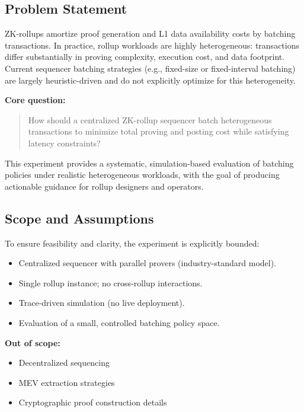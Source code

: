 \subsection{Problem Statement}

ZK-rollups amortize proof generation and L1 data availability costs by batching transactions. In practice, rollup workloads are highly heterogeneous: transactions differ substantially in proving complexity, execution cost, and data footprint. Current sequencer batching strategies (e.g., fixed-size or fixed-interval batching) are largely heuristic-driven and do not explicitly optimize for this heterogeneity.

\textbf{Core question:}
\begin{quote}
How should a centralized ZK-rollup sequencer batch heterogeneous transactions to minimize total proving and posting cost while satisfying latency constraints?
\end{quote}

This experiment provides a systematic, simulation-based evaluation of batching policies under realistic heterogeneous workloads, with the goal of producing actionable guidance for rollup designers and operators.

\subsection{Scope and Assumptions}

To ensure feasibility and clarity, the experiment is explicitly bounded:

\begin{itemize}[leftmargin=1.5em]
    \item Centralized sequencer with parallel provers (industry-standard model).
    \item Single rollup instance; no cross-rollup interactions.
    \item Trace-driven simulation (no live deployment).
    \item Evaluation of a small, controlled batching policy space.
\end{itemize}

\textbf{Out of scope:}
\begin{itemize}[leftmargin=1.5em]
    \item Decentralized sequencing
    \item MEV extraction strategies
    \item Cryptographic proof construction details
\end{itemize}

